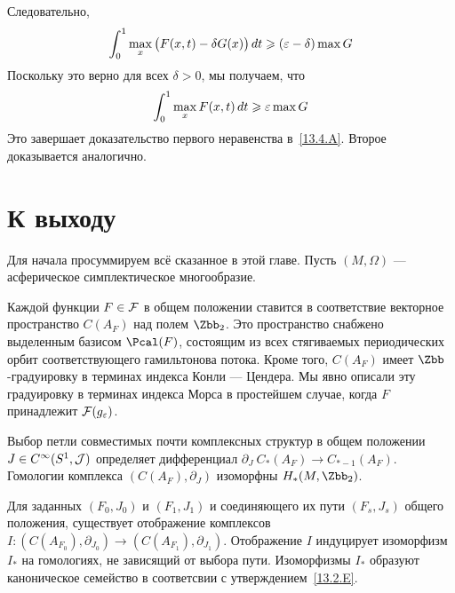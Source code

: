 Следовательно,
\[
\int_{0}^{1}\max_{x}\big(F(x,t)-\delta G(x)\big)\,d t
\geqslant
(\varepsilon-\delta)\max G
\]
Поскольку это верно для всех  $\delta > 0$, мы получаем, что
\[
\int_{0}^{1}\max_{x} F(x,t)\,d t
\geqslant
\varepsilon\max G
\]
Это завершает доказательство первого неравенства в~\ref{13.4.A}.
Второе доказывается аналогично.

\section{К выходу}\label{13.5}

Для начала просуммируем всё сказанное в этой главе.
Пусть $(M,\Omega)$ --- асферическое симплектическое многообразие.

\let\subsectionsave=\subsection
\makeatletter
\renewcommand{\subsection}{%
  \@startsection{subsection}%
  {2}%
  {0pt}%
  {1ex}%
  {0pt}%
  {\it}}
\makeatother
\def\thesubsection{\thesection.\Alph{subsection}}

\begin{ex}{}\label{13.5.A}
Каждой функции $F\in\mathcal{F}$ в общем положении ставится в соответствие
векторное пространство $C(A_{F})$ над полем $\Zbb_{2}$.
Это пространство снабжено выделенным базисом $\Pcal(F)$, состоящим из
всех стягиваемых периодических орбит соответствующего гамильтонова
потока. 
Кроме того, $C(A_{F})$ имеет $\Zbb$-градуировку в терминах индекса
Конли --- Цендера. 
Мы явно описали эту градуировку в терминах индекса Морса в простейшем
случае, когда $F$ принадлежит $\mathcal{F}(g_{\varepsilon})$.
\end{ex}

\begin{ex}{}\label{13.5.B}
Выбор петли совместимых почти комплексных структур в общем положении
$J\in C^{\infty}(S^{1}, \mathcal{J})$ определяет дифференциал
$\partial_{J}\:C_{*}(A_{F})\to C_{*-1}(A_{F})$.
Гомологии комплекса $(C(A_{F}),\partial_{J})$ изоморфны
$H_{*}(M,\Zbb_{2})$. 
\end{ex}

\begin{ex}{}\label{13.5.C}
Для заданных $(F_{0},J_{0})$ и $(F_{1},J_{1})$ и соединяющего их пути
$(F_{s},J_{s})$ общего положения, существует  отображение
комплексов $I:(C(A_{F_{0}}),\partial_{J_{0}})\to(C(A_{F_{1}}),\partial_{J_{1}})$.
Отображение $I$ индуцирует изоморфизм $I_{*}$ на гомологиях, не
зависящий от выбора пути. 
Изоморфизмы $I_{*}$ образуют каноническое семейство в соответсвии с
утверждением~\ref{13.2.E}. 
\end{ex}

